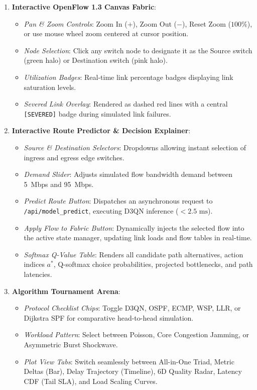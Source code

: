 \documentclass[12pt,a4paper,oneside]{report}
\begin{document}
\begin{enumerate}
    \item \textbf{Interactive OpenFlow 1.3 Canvas Fabric}:
    \begin{itemize}
        \item \textit{Pan \& Zoom Controls}: Zoom In ($+$), Zoom Out ($-$), Reset Zoom ($100\%$), or use mouse wheel zoom centered at cursor position.
        \item \textit{Node Selection}: Click any switch node to designate it as the Source switch (green halo) or Destination switch (pink halo).
        \item \textit{Utilization Badges}: Real-time link percentage badges displaying link saturation levels.
        \item \textit{Severed Link Overlay}: Rendered as dashed red lines with a central \texttt{[SEVERED]} badge during simulated link failures.
    \end{itemize}
    
    \item \textbf{Interactive Route Predictor \& Decision Explainer}:
    \begin{itemize}
        \item \textit{Source \& Destination Selectors}: Dropdowns allowing instant selection of ingress and egress edge switches.
        \item \textit{Demand Slider}: Adjusts simulated flow bandwidth demand between 5~Mbps and 95~Mbps.
        \item \textit{Predict Route Button}: Dispatches an asynchronous request to \texttt{/api/model\_predict}, executing D3QN inference ($<2.5\text{ ms}$).
        \item \textit{Apply Flow to Fabric Button}: Dynamically injects the selected flow into the active state manager, updating link loads and flow tables in real-time.
        \item \textit{Softmax Q-Value Table}: Renders all candidate path alternatives, action indices $a^*$, Q-softmax choice probabilities, projected bottlenecks, and path latencies.
    \end{itemize}
    
    \item \textbf{Algorithm Tournament Arena}:
    \begin{itemize}
        \item \textit{Protocol Checklist Chips}: Toggle D3QN, OSPF, ECMP, WSP, LLR, or Dijkstra SPF for comparative head-to-head simulation.
        \item \textit{Workload Pattern}: Select between Poisson, Core Congestion Jamming, or Asymmetric Burst Shockwave.
        \item \textit{Plot View Tabs}: Switch seamlessly between All-in-One Triad, Metric Deltas (Bar), Delay Trajectory (Timeline), 6D Quality Radar, Latency CDF (Tail SLA), and Load Scaling Curves.
    \end{itemize}
    

\end{enumerate}
\end{document}
